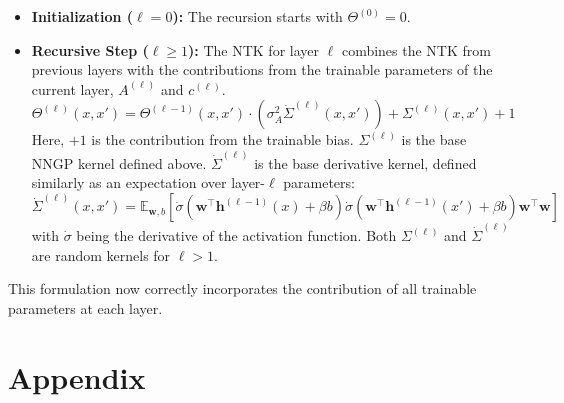 \documentclass[12pt]{article}
\begin{document}
\begin{itemize}
    \item \textbf{Initialization (\(\ell=0\)):} The recursion starts with $\Theta^{(0)} = 0$.
    
    \item \textbf{Recursive Step (\(\ell \ge 1\)):} The NTK for layer $\ell$ combines the NTK from previous layers with the contributions from the trainable parameters of the current layer, $A^{(\ell)}$ and $c^{(\ell)}$.
    \begin{equation}
        \boxed{
        \Theta^{(\ell)}(x, x') = \Theta^{(\ell-1)}(x, x') \cdot \left(\sigma_A^2\dot{\Sigma}^{(\ell)}(x, x')\right) + \Sigma^{(\ell)}(x, x') +1
        }
    \end{equation}
    Here, $+1$ is the contribution from the trainable bias. $\Sigma^{(\ell)}$ is the base NNGP kernel defined above. $\dot{\Sigma}^{(\ell)}$ is the base derivative kernel, defined similarly as an expectation over layer-$\ell$ parameters:
    \begin{equation}
        \dot{\Sigma}^{(\ell)}(x, x') = \mathbb{E}_{\bm{w}, b} \left[ \dot{\sigma}\left(\bm{w}^\top \bm{h}^{(\ell-1)}(x) + \beta b\right) \dot{\sigma}\left(\bm{w}^\top \bm{h}^{(\ell-1)}(x') + \beta b\right) \bm{w}^\top\bm{w} \right]
    \end{equation}
    with $\dot{\sigma}$ being the derivative of the activation function. Both $\Sigma^{(\ell)}$ and $\dot{\Sigma}^{(\ell)}$ are random kernels for $\ell > 1$.
\end{itemize}
This formulation now correctly incorporates the contribution of all trainable parameters at each layer.



\newpage

\appendix
\section{Appendix}
\end{document}
